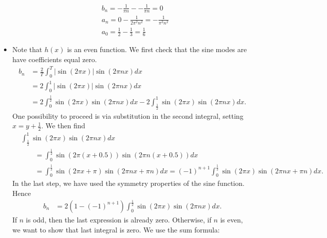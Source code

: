 \documentclass[11pt]{article}
\begin{document}
\begin{solution}
\begin{itemize}
\begin{align*}
                    &b_n = -\frac{1}{\pi n} - - \frac{1}{\pi n} = 0
                    \\& 
            a_n = 0 - \frac{1}{2\pi^2 n^2} =  - \frac{1}{\pi^2 n^2} 
                    \\&
            a_0 = \frac{1}{2} - \frac{1}{3} = \frac{1}{6}
        \end{align*}	
        \item
        Note that $h(x)$ is an even function.
        We first check that the sine modes are have coefficients equal zero.
        \begin{align*}
            b_n 
            &
            = 
            \frac{2}{T}
            \int_{0}^{T} |\sin( 2\pi x)| \sin(2\pi n x) dx
            \\&
            =
            2
            \int_{0}^{1} |\sin( 2\pi x)| \sin(2\pi n x) dx
            \\&
            =
            2
            \int_{0}^{\frac 1 2} \sin( 2\pi x) \sin(2\pi n x) dx
            -
            2
            \int_{\frac 1 2}^{1} \sin( 2\pi x) \sin(2\pi n x) dx
            .            
        \end{align*}
        One possibility to proceed is via substitution in the second integral, setting $x = y + \frac 1 2$. 
        We then find 
        \begin{align*}
            &
            \int_{\frac 1 2}^{1} 
            \sin( 2\pi x) \sin(2\pi n x) dx
            \\&\qquad 
            =
            \int_{0}^{\frac 1 2} 
            \sin( 2\pi (x+ 0.5)) \sin(2\pi n (x+ 0.5)) dx
            \\&\qquad 
            =
            \int_{0}^{\frac 1 2} 
            \sin( 2\pi x + \pi ) \sin(2\pi n x + \pi n) dx
            =
            (-1)^{n+1}
            \int_{0}^{\frac 1 2} 
            \sin( 2\pi x ) \sin(2\pi n x + \pi n) dx
            .
        \end{align*}
        In the last step, we have used the symmetry properties of the sine function. 
        Hence 
        \begin{align*}
            b_n 
            &
            =
            2 \left( 1 - (-1)^{n+1} \right)
            \int_{0}^{\frac 1 2} \sin( 2\pi x) \sin(2\pi n x) dx
            .
        \end{align*}
        If $n$ is odd, then the last expression is already zero. 
        Otherwise, if $n$ is even, we want to show that last integral is zero. 
        We use the sum formula:

\end{itemize}
\end{solution}
\end{document}
